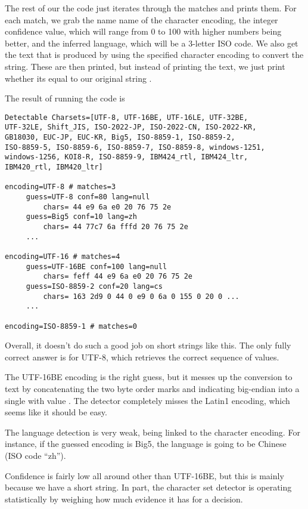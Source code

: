 The rest of our the code just iterates through the matches and prints them.
%
%
For each match, we grab the name name of the character encoding, the
integer confidence value, which will range from 0 to 100 with higher
numbers being better, and the inferred language, which will be a
3-letter ISO code.  We also get the text that is produced by using
the specified character encoding to convert the string.  
These are then printed, but instead of printing the text, we just
print whether its equal to our original string .

The result of running the code is
%
\begin{verbatim}
Detectable Charsets=[UTF-8, UTF-16BE, UTF-16LE, UTF-32BE, 
UTF-32LE, Shift_JIS, ISO-2022-JP, ISO-2022-CN, ISO-2022-KR, 
GB18030, EUC-JP, EUC-KR, Big5, ISO-8859-1, ISO-8859-2, 
ISO-8859-5, ISO-8859-6, ISO-8859-7, ISO-8859-8, windows-1251, 
windows-1256, KOI8-R, ISO-8859-9, IBM424_rtl, IBM424_ltr, 
IBM420_rtl, IBM420_ltr]

encoding=UTF-8 # matches=3
     guess=UTF-8 conf=80 lang=null
         chars= 44 e9 6a e0 20 76 75 2e
     guess=Big5 conf=10 lang=zh
         chars= 44 77c7 6a fffd 20 76 75 2e
     ...

encoding=UTF-16 # matches=4
     guess=UTF-16BE conf=100 lang=null
         chars= feff 44 e9 6a e0 20 76 75 2e
     guess=ISO-8859-2 conf=20 lang=cs
         chars= 163 2d9 0 44 0 e9 0 6a 0 155 0 20 0 ...
     ...

encoding=ISO-8859-1 # matches=0
\end{verbatim}
%
Overall, it doesn't do such a good job on short strings like this.
The only fully correct answer is for UTF-8, which retrieves
the correct sequence of  values.

The UTF-16BE encoding is the right guess, but it messes up the
conversion to text by concatenating the two byte order marks 
and  indicating big-endian into a single  with value
.  The detector completely misses the Latin1 encoding, which
seems like it should be easy.    

The language detection is very weak, being linked to the character
encoding.  For instance, if the guessed encoding is Big5, the language
is going to be Chinese (ISO code ``zh'').

Confidence is fairly low all around other than UTF-16BE, but
this is mainly because we have a short string.  In part, the
character set detector is operating statistically by weighing how
much evidence it has for a decision.



